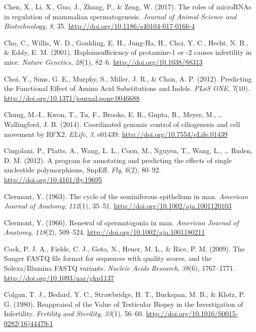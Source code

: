 \documentclass[12pt,twoside]{reedthesis}
\theoremstyle{definition}
\theoremstyle{definition}
\theoremstyle{remark}
\begin{document}
  \hypertarget{ref-Chen2017}{}
  Chen, X., Li, X., Guo, J., Zhang, P., \& Zeng, W. (2017). The roles of
  microRNAs in regulation of mammalian spermatogenesis. \emph{Journal of
  Animal Science and Biotechnology}, \emph{8}, 35.
  \url{http://doi.org/10.1186/s40104-017-0166-4}
  
  \hypertarget{ref-Cho2001}{}
  Cho, C., Willis, W. D., Goulding, E. H., Jung-Ha, H., Choi, Y. C.,
  Hecht, N. B., \& Eddy, E. M. (2001). Haploinsufficiency of protamine-1
  or -2 causes infertility in mice. \emph{Nature Genetics}, \emph{28}(1),
  82--6. \url{http://doi.org/10.1038/88313}
  
  \hypertarget{ref-Choi2012}{}
  Choi, Y., Sims, G. E., Murphy, S., Miller, J. R., \& Chan, A. P. (2012).
  Predicting the Functional Effect of Amino Acid Substitutions and Indels.
  \emph{PLoS ONE}, \emph{7}(10).
  \url{http://doi.org/10.1371/journal.pone.0046688}
  
  \hypertarget{ref-Chung2014}{}
  Chung, M.-I., Kwon, T., Tu, F., Brooks, E. R., Gupta, R., Meyer, M.,
  \ldots{} Wallingford, J. B. (2014). Coordinated genomic control of
  ciliogenesis and cell movement by RFX2. \emph{ELife}, \emph{3}, e01439.
  \url{http://doi.org/10.7554/eLife.01439}
  
  \hypertarget{ref-Cingolani2012}{}
  Cingolani, P., Platts, A., Wang, L. L., Coon, M., Nguyen, T., Wang, L.,
  \ldots{} Ruden, D. M. (2012). A program for annotating and predicting
  the effects of single nucleotide polymorphisms, SnpEff. \emph{Fly},
  \emph{6}(2), 80--92. \url{http://doi.org/10.4161/fly.19695}
  
  \hypertarget{ref-Clermont1963}{}
  Clermont, Y. (1963). The cycle of the seminiferous epithelium in man.
  \emph{American Journal of Anatomy}, \emph{112}(1), 35--51.
  \url{http://doi.org/10.1002/aja.1001120103}
  
  \hypertarget{ref-Clermont1966}{}
  Clermont, Y. (1966). Renewal of spermatogonia in man. \emph{American
  Journal of Anatomy}, \emph{118}(2), 509--524.
  \url{http://doi.org/10.1002/aja.1001180211}
  
  \hypertarget{ref-Cock2009}{}
  Cock, P. J. A., Fields, C. J., Goto, N., Heuer, M. L., \& Rice, P. M.
  (2009). The Sanger FASTQ file format for sequences with quality scores,
  and the Solexa/Illumina FASTQ variants. \emph{Nucleic Acids Research},
  \emph{38}(6), 1767--1771. \url{http://doi.org/10.1093/nar/gkp1137}
  
  \hypertarget{ref-Colgan1980}{}
  Colgan, T. J., Bedard, Y. C., Strawbridge, H. T., Buckspan, M. B., \&
  Klotz, P. G. (1980). Reappraisal of the Value of Testicular Biopsy in
  the Investigation of Infertility. \emph{Fertility and Sterility},
  \emph{33}(1), 56--60. \url{http://doi.org/10.1016/S0015-0282(16)44479-1}
  
\end{document}

